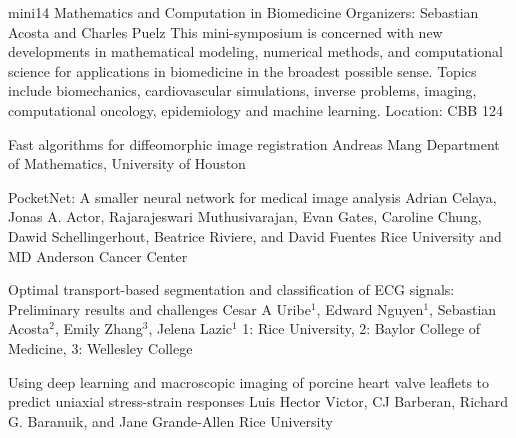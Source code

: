 \mini
{mini14}
{Mathematics and Computation in Biomedicine}
{Organizers: Sebastian Acosta and Charles Puelz}
{This mini-symposium is concerned with new developments in mathematical modeling, numerical methods, and computational science for applications in biomedicine in the broadest possible sense. Topics include biomechanics, cardiovascular simulations, inverse problems, imaging, computational oncology, epidemiology and machine learning.}
{Location: CBB 124}

\begin{talks}
\item\talk
{Fast algorithms for diffeomorphic image registration}
{Andreas Mang}
{Department of Mathematics, University of Houston}
\item\talk
{PocketNet: A smaller neural network for medical image analysis}
{Adrian Celaya, Jonas A. Actor, Rajarajeswari Muthusivarajan, Evan
Gates, Caroline Chung, Dawid Schellingerhout, Beatrice Riviere, and
David Fuentes}
{Rice University and MD Anderson Cancer Center}
\item\talk
{Optimal transport-based segmentation and classification of ECG signals: Preliminary results and challenges}
{Cesar A Uribe$^{1}$, Edward Nguyen$^{1}$, Sebastian Acosta$^{2}$, Emily Zhang$^{3}$, Jelena Lazic$^{1}$}
{1: Rice University, 2: Baylor College of Medicine, 3: Wellesley College}
\item\talk
{Using deep learning and macroscopic imaging of porcine heart valve leaflets to predict uniaxial stress-strain responses}
{Luis Hector Victor, CJ Barberan, Richard G. Baranuik, and Jane Grande-Allen}
{Rice University}
\end{talks}
\room
